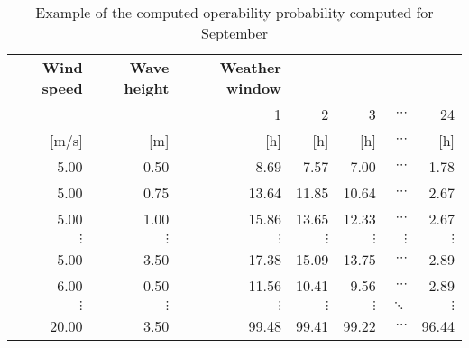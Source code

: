 \begin{table}
\label{tab:proba}
\begin{tabular}{rrrrrrr}
\hline
{\bf Wind speed} & {\bf Wave height} & {\bf Weather window} &            &            &            &            \\

           &            &          1 &          2 &          3 &  $\cdots$ &         24 \\

     [m/s] &        [m] &        [h] &        [h] &        [h] &  $\cdots$ &        [h] \\
\hline
      5.00 &       0.50 &       8.69 &       7.57 &       7.00 &  $\cdots$ &       1.78 \\

      5.00 &       0.75 &      13.64 &      11.85 &      10.64 &  $\cdots$ &       2.67 \\

      5.00 &       1.00 &      15.86 &      13.65 &      12.33 &  $\cdots$ &       2.67 \\

 $\vdots$ &  $\vdots$ &  $\vdots$ &  $\vdots$ &  $\vdots$ &  $\vdots$ &  $\vdots$ \\

      5.00 &       3.50 &      17.38 &      15.09 &      13.75 &  $\cdots$ &       2.89 \\

      6.00 &       0.50 &      11.56 &      10.41 &       9.56 &  $\cdots$ &       2.89 \\

 $\vdots$ &  $\vdots$ &  $\vdots$ &  $\vdots$ &  $\vdots$ & $\ddots$           &  $\vdots$ \\

     20.00 &       3.50 &      99.48 &      99.41 &      99.22 &  $\cdots$ &      96.44 \\
\hline
\end{tabular}  

\caption{Example of the computed operability probability computed for September}
\end{table}